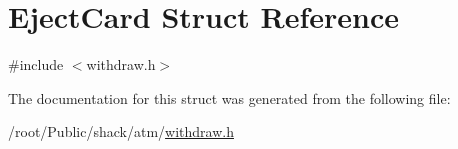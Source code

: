 \hypertarget{structEjectCard}{\section{Eject\-Card Struct Reference}
\label{structEjectCard}
}


{\ttfamily \#include $<$withdraw.\-h$>$}



The documentation for this struct was generated from the following file\-:\begin{DoxyCompactItemize}
\item 
/root/\-Public/shack/atm/\hyperlink{withdraw_8h}{withdraw.\-h}\end{DoxyCompactItemize}
